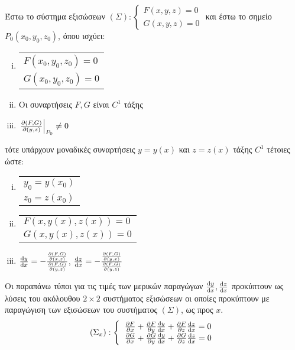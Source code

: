 Έστω το σύστημα εξισώσεων $(\Sigma):
\begin{cases}
    F(x,y,z) = 0  \\
    G(x,y,z) = 0
\end{cases}$
και έστω το σημείο $ P_0(x_0,y_0,z_0) $, όπου ισχύει:
\begin{enumerate}[(i)]
    \item  \begin{tabular}{l}
            $F(x_0,y_0,z_0) = 0$ \\
            $G(x_0,y_0,z_0) = 0$
        \end{tabular}
    \item Οι συναρτήσεις $ F, G $ είναι $ C^{1} $ τάξης 
    \item $ \left.\pdv{(F,G)}{(y,z)}\right|_{P_0} \neq 0 $ 
\end{enumerate}
τότε υπάρχουν μοναδικές συναρτήσεις $ y = y(x) $ και $ z = z(x) $ τάξης $ C^{1} $ 
τέτοιες ώστε:
\begin{enumerate}[(i)]
    \item \begin{tabular}{l}
            $ y_0 = y(x_0) $ \\
            $ z_0 = z(x_0) $
        \end{tabular}
    \item \begin{tabular}{l}
            $ F(x,y(x),z(x)) = 0 $ \\
            $ G(x,y(x),z(x)) = 0 $
        \end{tabular}
    \item $ \dv{y}{x} = - \frac{\pdv{(F,G)}{(x,z)}}{\pdv{(F,G)}{(y,z)}} $, 
        $ \dv{z}{x} = - \frac{\pdv{(F,G)}{(y,x)}}{\pdv{(F,G)}{(y,z)}} $
\end{enumerate}

\begin{rem}
    Οι παραπάνω τύποι για τις τιμές των μερικών παραγώγων $ \dv{y}{x}, \dv{z}{x}$ 
    προκύπτουν ως λύσεις του ακόλουθου $ 2 \times 2 $ συστήματος εξισώσεων οι οποίες 
    προκύπτουν με παραγώγιση των εξισώσεων του συστήματος $ (\Sigma) $, ως προς $x$.
    \renewcommand{\arraystretch}{2}
    \[
        \begin{aligned}
            (\Sigma_x): \left\{\begin{tabular}{l}
                    $\pdv{F}{x} + \pdv{F}{y}\dv{y}{x} + \pdv{F}{z}\dv{z}{x} = 0$ \\
                    $\pdv{G}{x} + \pdv{G}{y}\dv{y}{x} + \pdv{G}{z}\dv{z}{x} = 0$
                \end{tabular}
            \right.
        \end{aligned}
    \]
\end{rem}

